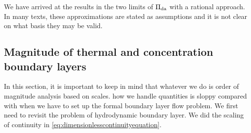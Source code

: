 We have arrived at the results in the two limits of $\Pi_\text{da}$ with a rational approach. In many texts, these approximations are stated as \adhoc assumptions and it is not clear on what basis they may be valid.


\subsection{Magnitude of thermal and concentration boundary layers}
In this section, it is important to keep in mind that whatever we do is order of magnitude analysis based on scales. how we handle quantities is sloppy compared with when we have to set up the formal boundary layer flow problem. We first need to revisit the problem of hydrodynamic boundary layer. We did the scaling of continuity in \cref{eq:dimensionlesscontinuityequation}.

